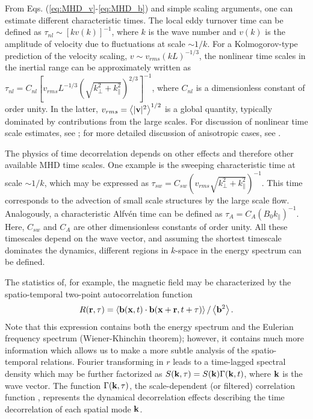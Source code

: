 \documentclass[aip,pop,reprint,amsmath,amssymb,floatfix]{revtex4-1}
\begin{document}
From Eqs. (\ref{eq:MHD_v}-\ref{eq:MHD_b}) and simple scaling arguments,
one can estimate different characteristic times. The local eddy
turnover time can be defined as $\tau_{nl} \sim \left[ k v(k)
\right]^{-1}$, where $k$ is the wave number and $v(k)$ is the amplitude
of velocity due to fluctuations at scale $\sim 1/k$. For a Kolmogorov-type
prediction of the velocity scaling, $v \sim v_{rms} \left(kL\right)^{-1/3}$,
the nonlinear time scales in the inertial range can be approximately
written as $\tau_{nl} = C_{nl} \left [ v_{rms} L^{-1/3}
  \left(\sqrt{k^2_\perp + k^2_\parallel}\right)^{2/3}\right ]^{-1}$,
where $C_{nl}$ is a dimensionless constant of order unity. In the
latter, $v_{rms} = \left\langle |{\bf v}|^2 \right\rangle ^{1/2}$ is a
global quantity, typically dominated by contributions from the large
scales. For discussion of nonlinear time scale estimates, see
\cite{zhou_magnetohydrodynamic_2004}; for more detailed discussion of
anisotropic cases, see \cite{matthaeus_anisotropic_2009}.

The physics of time decorrelation depends on other effects and
therefore other available MHD time scales. One example is the sweeping
characteristic time at scale $\sim 1/k$, which may be expressed as
$\tau_{sw} = C_{sw} \left( v_{rms}\sqrt{k^2_\perp + k^2_\parallel}
\right)^{-1}$. This time corresponds to the advection of small scale
structures by the large scale flow. Analogously, a characteristic
Alfv\'en time can be defined as $\tau_A= C_A \left( B_0 k_\parallel
\right)^{-1}$. Here, $C_{sw}$ and $C_A$ are other dimensionless
constants of order unity. All these timescales depend on the wave
vector, and assuming the shortest timescale dominates the dynamics,
different regions in $k$-space in the energy spectrum can be defined.

The statistics of, for example, the magnetic field may be
characterized by the spatio-temporal two-point autocorrelation
function 
\begin{equation}
R({\bf r},\tau) = \left\langle {\bf b}( {\bf x},t) \cdot
  {\bf b}( {\bf x} + {\bf r},t+\tau) \right\rangle / \left\langle {\bf
    b}^2 \right\rangle.
\label{eq:Rbij}
\end{equation}
Note that this expression contains both the energy spectrum and the
Eulerian frequency spectrum (Wiener-Khinchin theorem); however, it
contains much more information which allows us to make a more subtle
analysis of the spatio-temporal relations. Fourier transforming in $r$
leads to a time-lagged spectral density which may be further
factorized as $S({\bf k},\tau) = S({\bf k})\Gamma({\bf k},t)$, where
${\bf k}$ is the wave vector. The function $\Gamma({\bf k},\tau)$, the
scale-dependent (or filtered) correlation function
\cite{heisenberg_zur_1948, comte-bellot_simple_1971,
  orszag_numerical_1972}, represents the dynamical decorrelation
effects describing the time decorrelation of each spatial mode 
${\bf k}$.
\end{document}
